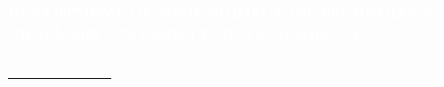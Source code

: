 \newpage

\vtop{
    \null\vspace{-47.5mm}
    \centerline{\textcolor{thesisHeaderColor}{\rule{1.28\textwidth}{28mm}}}
    \null\vspace{-9mm}
    \centerline{\textcolor{headerBrown}{\rule{1.28\textwidth}{4pt}}}
}

\addtolength{\voffset}{2cm}
\renewcommand{\familydefault}{\sfdefault} \normalfont %
\pagestyle{empty}
\vspace*{-4.5cm}
\noindent
\textcolor{white}{\footnotesize \textbf{DEPARTMENT OF SOME SUBJECT OR TECHNOLOGY}\\
\textbf{CHALMERS UNIVERSITY OF TECHNOLOGY} \\
Gothenburg, Sweden \\
\href{www.chalmers.se}{\textcolor{white}{www.chalmers.se}}}


